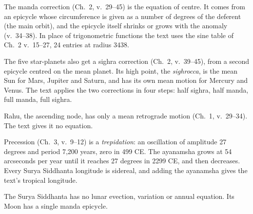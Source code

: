 \documentclass[11pt,a4paper]{article}
\begin{document}
The manda correction (Ch.~2, v.~29--45) is the equation of centre. It comes from an epicycle whose circumference is given as a number of degrees of the deferent (the main orbit), and the epicycle itself shrinks or grows with the anomaly (v.~34--38). In place of trigonometric functions the text uses the sine table of Ch.~2 v.~15--27, 24 entries at radius 3438.

The five star-planets also get a sighra correction (Ch.~2, v.~39--45), from a second epicycle centred on the mean planet. Its high point, the \textit{sighrocca}, is the mean Sun for Mars, Jupiter and Saturn, and has its own mean motion for Mercury and Venus. The text applies the two corrections in four steps: half sighra, half manda, full manda, full sighra.

Rahu, the ascending node, has only a mean retrograde motion (Ch.~1, v.~29--34). The text gives it no equation.

Precession (Ch.~3, v.~9--12) is a \emph{trepidation}: an oscillation of amplitude 27 degrees and period 7,200 years, zero in 499 CE. The ayanamsha grows at 54 arcseconds per year until it reaches 27 degrees in 2299 CE, and then decreases. Every Surya Siddhanta longitude is sidereal, and adding the ayanamsha gives the text's tropical longitude.

The Surya Siddhanta has no lunar evection, variation or annual equation. Its Moon has a single manda epicycle.
\end{document}
